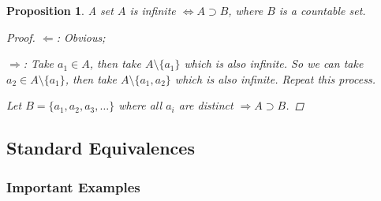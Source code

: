 \documentclass[12pt]{article}
\theoremstyle{blueplain}
\newtheorem{proposition}[theorem]{Proposition}
\theoremstyle{bluedef}
\theoremstyle{blueremark}
\numberwithin{equation}{section}
\begin{document}
\begin{proposition}
  A set $A$ is infinite $\Leftrightarrow A \supset B$, where $B$  is a countable set.
  \begin{proof}
    $\Leftarrow$: Obvious;

    $\Rightarrow$: Take $a_1 \in A$, then take $A \setminus \{a_1\}$ which is also infinite. So we can take $a_2 \in A \setminus \{a_1\}$, then take $A \setminus \{a_1, a_2\}$ which is also infinite. Repeat this process.

    Let $B = \{a_1, a_2, a_3, \ldots\}$ where all $a_i$ are distinct $\Rightarrow A \supset B$.
  \end{proof}
\end{proposition}

\clearpage

\subsection{Standard Equivalences}

\subsubsection{Important Examples}
\end{document}
